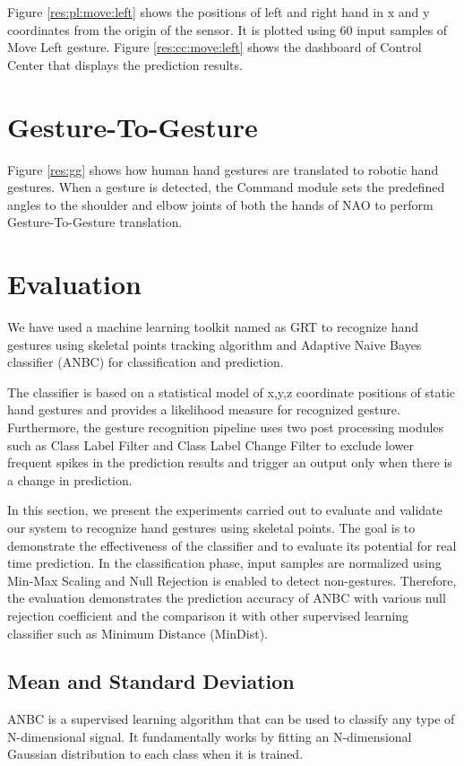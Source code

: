 

Figure \ref{res:pl:move:left} shows the positions of left and right hand in x and y coordinates from the origin of the sensor. It is plotted using 60 input samples of Move Left gesture. Figure \ref{res:cc:move:left} shows the dashboard of Control Center that displays the prediction results. 

\clearpage

\section{Gesture-To-Gesture} Figure \ref{res:gg} shows how human hand gestures are translated to robotic hand gestures. When a gesture is detected, the Command module sets the predefined angles to the shoulder and elbow joints of both the hands of NAO to perform Gesture-To-Gesture translation. 



\section{Evaluation} We have used a machine learning toolkit named as GRT to recognize hand gestures using skeletal points tracking algorithm and Adaptive Naive Bayes classifier (ANBC) for classification and prediction. 

The classifier is based on a statistical model of x,y,z coordinate positions of static hand gestures and provides a likelihood measure for recognized gesture. Furthermore, the gesture recognition pipeline uses two post processing modules such as Class Label Filter and Class Label Change Filter to exclude lower frequent spikes in the prediction results and trigger an output only when there is a change in prediction.

In this section, we present the experiments carried out to evaluate and validate our system to recognize hand gestures using skeletal points. The goal is to demonstrate the effectiveness of the classifier and to evaluate its potential for real time prediction. In the classification phase, input samples are normalized using Min-Max Scaling and Null Rejection is enabled to detect non-gestures. Therefore, the evaluation demonstrates the prediction accuracy of ANBC with various null rejection coefficient and the comparison it with other supervised learning classifier such as Minimum Distance (MinDist).

\subsection{Mean and Standard Deviation} ANBC is a supervised learning algorithm that can be used to classify any type of N-dimensional signal. It fundamentally works by fitting an N-dimensional Gaussian distribution to each class when it is trained.

